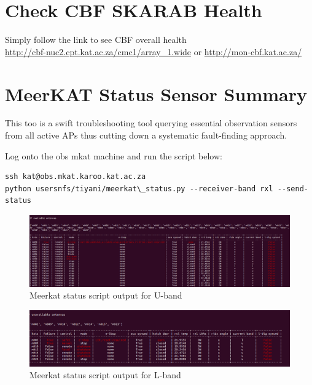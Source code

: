 
\section{ Check CBF SKARAB Health}

Simply follow the link to see CBF overall health\\ \url{http://cbf-nuc2.cpt.kat.ac.za/cmc1/array\_1.wide} or \url{http://mon-cbf.kat.ac.za/}

\section{ MeerKAT Status Sensor Summary}
This too is a swift troubleshooting tool querying essential observation sensors from all active APs thus cutting down a systematic fault-finding approach.   

Log onto the obs mkat machine and run the script below:
\begin{lstlisting}[style=DOS]
ssh kat@obs.mkat.karoo.kat.ac.za
python usersnfs/tiyani/meerkat\_status.py --receiver-band rxl --send-status   

\end{lstlisting}


\begin{figure}[!thb]
	\centering
	\includegraphics[scale=0.18]{Chapters/images/image78.png}
	
	\caption{Meerkat status script  output for U-band}
	\label{fig:image78}
\end{figure}



\begin{figure}[!thb]
	\centering
	\includegraphics[scale=0.23]{Chapters/images/image107.png}
	
	\caption{Meerkat status script  output for L-band}
	\label{fig:image107}
\end{figure}

